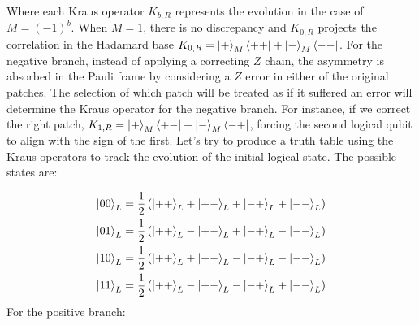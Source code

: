 \documentclass[12pt, twoside, openany]{book}
\begin{document}
Where each Kraus operator $K_{b,R}$ represents the evolution in the case of $M= (-1)^b$. When $M=1$, there is no discrepancy and $K_{0,R}$ projects the correlation in the Hadamard base $K_{0,R} = \ket{+}_M \bra{++} + \ket{-}_M \bra{--}$. For the negative branch, instead of applying a correcting $Z$ chain, the asymmetry is absorbed in the Pauli frame by considering a $Z$ error in either of the original patches. The selection of which patch will be treated as if it suffered an error will determine the Kraus operator for the negative branch. For instance, if we correct the right patch, $K_{1,R} = \ket{+}_M \bra{+-} + \ket{-}_M \bra{-+}$, forcing the second logical qubit to align with the sign of the first. Let's try to produce a truth table using the Kraus operators to track the evolution of the initial logical state. The possible states are:

\begin{align*}
\ket{00}_L &= \frac{1}{2}\left( \ket{++}_L + \ket{+-}_L + \ket{-+}_L + \ket{--}_L \right) \\
\ket{01}_L &= \frac{1}{2}\left( \ket{++}_L - \ket{+-}_L + \ket{-+}_L - \ket{--}_L \right) \\
\ket{10}_L &= \frac{1}{2}\left( \ket{++}_L + \ket{+-}_L - \ket{-+}_L - \ket{--}_L \right) \\
\ket{11}_L &= \frac{1}{2}\left( \ket{++}_L - \ket{+-}_L - \ket{-+}_L + \ket{--}_L \right)
\end{align*}
For the positive branch:
\end{document}
